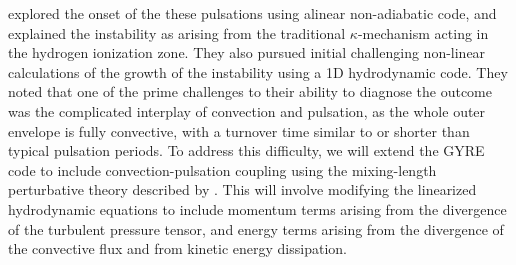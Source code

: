 \citet{1997AampA...327..224H} explored the onset of the these pulsations using alinear non-adiabatic code, and explained the instability  as arising from the traditional $\kappa$-mechanism acting in the hydrogen ionization zone. They also pursued initial challenging
non-linear calculations of the growth of the instability using a 1D hydrodynamic code. They noted that one of the prime challenges to
their ability to diagnose the outcome was the complicated interplay of
convection and pulsation, as the whole outer envelope is fully
convective, with a turnover time similar to or shorter than typical pulsation periods. To address this difficulty, we will extend the GYRE code to include convection-pulsation coupling using the mixing-length perturbative theory described by \citet{Grigahcene:2005}. This will involve modifying the linearized hydrodynamic equations to include momentum terms arising from the divergence of the turbulent pressure tensor, and energy terms arising from the divergence of the convective flux and from kinetic energy dissipation.